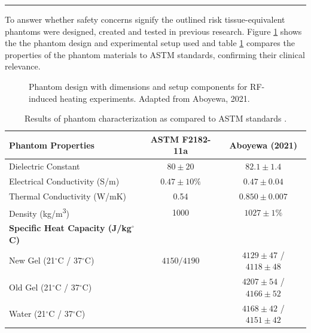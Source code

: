 \documentclass[final]{article}
\newcommand{\posterSection}[1]{
    \noindent{
        \color{DarkBlue}
        \fontsize{50}{60}\bfseries #1
    }
    \vspace{0.5em}
    \hrule
    \vspace{1em}
}
\begin{document}
\begin{multicols}{3}
\posterSection{Background}
To answer whether safety concerns signify the outlined risk tissue-equivalent phantoms were designed, created and tested in previous research. Figure \ref{fig:phantom_design} shows the the phantom design and experimental setup used and table \ref{tab:phantom_characterization} compares the properties of the phantom materials to ASTM standards, confirming their clinical relevance.

\begin{figure}[H]
    \centering
    
    \caption{Phantom design with dimensions and setup components for RF-induced heating experiments. Adapted from Aboyewa, 2021.\cite{aboyewa2021}}
    \label{fig:phantom_design}
\end{figure}

\begin{table}[H]
    \centering
    \renewcommand{\arraystretch}{1.1} %
    \setlength{\tabcolsep}{5pt} %
    \begin{tabular}{|l|c|c|}
        \hline
        \textbf{Phantom Properties} & \textbf{ASTM F2182-11a} & \textbf{Aboyewa (2021)} \\
        \hline
        Dielectric Constant & $80 \pm 20$ & $82.1 \pm 1.4$ \\
        Electrical Conductivity (S/m) & $0.47 \pm 10\%$ & $0.47 \pm 0.04$ \\
        Thermal Conductivity (W/mK) & 0.54 & $0.850 \pm 0.007$ \\
        Density (kg/m\textsuperscript{3}) & 1000 & $1027 \pm 1\%$ \\
        \hline
        \textbf{Specific Heat Capacity (J/kg$^\circ$C)} & & \\
        New Gel (21$^\circ$C / 37$^\circ$C) & $4150 / 4190$ & $4129 \pm 47$ / $4118 \pm 48$ \\
        Old Gel (21$^\circ$C / 37$^\circ$C) & & $4207 \pm 54$ / $4166 \pm 52$ \\
        Water (21$^\circ$C / 37$^\circ$C) &  & $4168 \pm 42$ / $4151 \pm 42$ \\
        \hline
    \end{tabular}
    \caption{Results of phantom characterization as compared to ASTM standards \cite{aboyewa2021}.}
    \label{tab:phantom_characterization}
\end{table}


\end{multicols}
\end{document}
